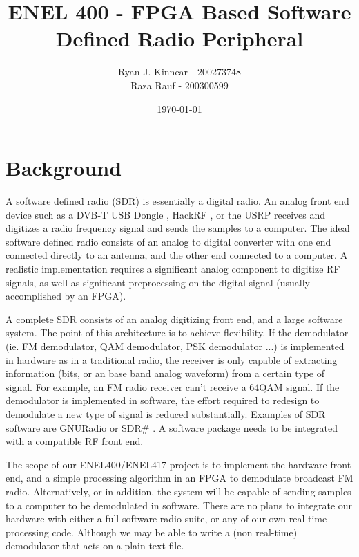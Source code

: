\documentclass[a4paper, 12pt]{article}
\author{Ryan J. Kinnear - 200273748 \\ Raza Rauf - 200300599}
\title{ENEL 400 - FPGA Based Software Defined Radio Peripheral}
\date{\today}
\begin{document}
\maketitle

\section{Background}
A software defined radio (SDR) is essentially a digital radio.  An analog front end device such as a DVB-T USB Dongle \cite{usb_dongle}, HackRF \cite{hackrf}, or the USRP \cite{usrp} receives and digitizes a radio frequency signal and sends the samples to a computer.  The ideal software defined radio consists of an analog to digital converter with one end connected directly to an antenna, and the other end connected to a computer.  A realistic implementation requires a significant analog component to digitize RF signals, as well as significant preprocessing on the digital signal (usually accomplished by an FPGA).

A complete SDR consists of an analog digitizing front end, and a large software system.  The point of this architecture is to achieve flexibility.  If the demodulator (ie. FM demodulator, QAM demodulator, PSK demodulator ...) is implemented in hardware as in a traditional radio, the receiver is only capable of extracting information (bits, or an base band analog waveform) from a certain type of signal.  For example, an FM radio receiver can't receive a 64QAM signal.  If the demodulator is implemented in software, the effort required to redesign to demodulate a new type of signal is reduced substantially.  Examples of SDR software are GNURadio \cite{gnu_radio} or SDR\# \cite{sdr_sharp}.  A software package needs to be integrated with a compatible RF front end.

The scope of our ENEL400/ENEL417 project is to implement the hardware front end, and a simple processing algorithm in an FPGA to demodulate broadcast FM radio.  Alternatively, or in addition, the system will be capable of sending samples to a computer to be demodulated in software.  There are no plans to integrate our hardware with either a full software radio suite, or any of our own real time processing code.  Although we may be able to write a (non real-time) demodulator that acts on a plain text file.
\end{document}
